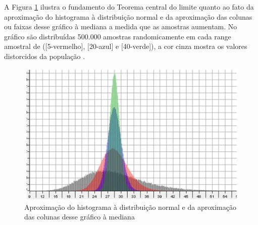 A Figura \ref{fig:statisticsbyjim_central_limit_theorem} ilustra o fundamento do Teorema central do limite quanto ao fato da aproximação do histograma à distribuição normal e da aproximação das colunas ou faixas desse gráfico à mediana a medida que as amostras aumentam. No gráfico são distribuídas 500.000 amostras randomicamente em cada range amostral de ([5-vermelho], [20-azul] e [40-verde]), a cor cinza mostra os valores distorcidos da população \cite{statisticsbyjim_central_limite_theorem_explainded}.
\begin{figure}[H]
\caption{Aproximação do histograma à distribuição normal e da aproximação das colunas desse gráfico à mediana}
\label{fig:statisticsbyjim_central_limit_theorem}
\centering
\includegraphics[scale=1.2]{sections/images/statisticsbyjim_central_limit_theorem.jpg}
\end{figure}

